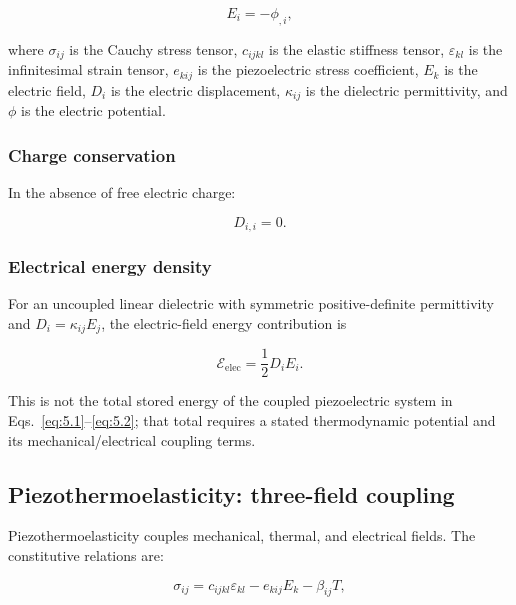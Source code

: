 \begin{equation}
E_i = -\phi_{,i},
\label{eq:5.3}
\end{equation}

where $\sigma_{ij}$ is the Cauchy stress tensor, $c_{ijkl}$ is the elastic stiffness tensor, $\varepsilon_{kl}$ is the infinitesimal strain tensor, $e_{kij}$ is the piezoelectric stress coefficient, $E_k$ is the electric field, $D_i$ is the electric displacement, $\kappa_{ij}$ is the dielectric permittivity, and $\phi$ is the electric potential.

\subsubsection{Charge conservation}

In the absence of free electric charge:

\begin{equation}
D_{i,i} = 0.
\label{eq:5.4}
\end{equation}

\subsubsection{Electrical energy density}

For an uncoupled linear dielectric with symmetric positive-definite permittivity and $D_i=\kappa_{ij}E_j$, the electric-field energy contribution is

\begin{equation}
\mathcal{E}_{\mathrm{elec}} = \frac{1}{2}D_i E_i.
\label{eq:5.5}
\end{equation}

This is not the total stored energy of the coupled piezoelectric system in Eqs.~\eqref{eq:5.1}--\eqref{eq:5.2}; that total requires a stated thermodynamic potential and its mechanical/electrical coupling terms.

\subsection{Piezothermoelasticity: three-field coupling}
\label{sec:5.2}

Piezothermoelasticity couples mechanical, thermal, and electrical fields. The constitutive relations are:

\begin{equation}
\sigma_{ij} = c_{ijkl}\varepsilon_{kl} - e_{kij}E_k - \beta_{ij}T,
\label{eq:5.6}
\end{equation}

